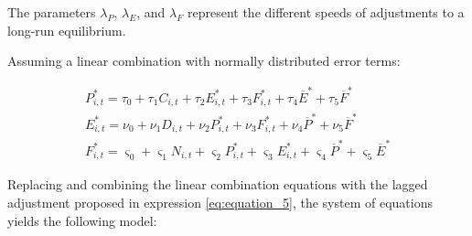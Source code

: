 \documentclass[a4paper,11pt,oneside]{article}
\begin{document}
The parameters $\lambda_P$, $\lambda_{E}$, and $\lambda_{F}$ represent the different speeds of adjustments to a long-run equilibrium.

Assuming a linear combination with normally distributed error terms:

\begin{equation*}
\begin{array}{l}
P_{i,t}^* = \tau_0 + \tau_1 C_{i,t} + \tau_2 E_{i,t}^* + \tau_3 F_{i,t}^* + \tau_4 \overline{E}^* + \tau_5 \overline{F}^* \\
E_{i,t}^* = \nu_0 + \nu_1 D_{i,t} + \nu_2 P_{i,t}^* + \nu_3 F_{i,t}^* + \nu_4 \overline{P}^* + \nu_5 \overline{F}^* \\
F_{i,t}^* = \varsigma_0 + \varsigma_1 N_{i,t} + \varsigma_2 P_{i,t}^* + \varsigma_3 E_{i,t}^* + \varsigma_4 \overline{P}^* + \varsigma_5 \overline{E}^*
\end{array}
\end{equation*}

Replacing and combining the linear combination equations with the lagged adjustment proposed in expression \eqref{eq:equation_5}, the system of equations yields the following model:



\end{document}
